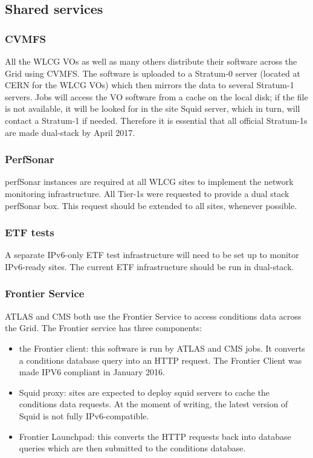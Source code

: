 \documentclass[11pt]{article}
\begin{document}

\subsection{Shared services}
\subsubsection{CVMFS}
All the WLCG VOs as well as many others distribute their software
across the Grid using CVMFS. The software is uploaded to a Stratum-0
server (located at CERN for the WLCG VOs) which then mirrors the data
to several Stratum-1 servers.  Jobs will access the VO software from a
cache on the local disk; if the file is not available, it will be
looked for in the site Squid server, which in turn, will contact a
Stratum-1 if needed.  Therefore it is essential that all official
Stratum-1s \cite{Stratum1} are made dual-stack by April 2017.

\subsubsection{PerfSonar}
perfSonar instances are required at all WLCG sites to implement the
network monitoring infrastructure. All Tier-1s were requested to
provide a dual stack perfSonar box. This request should be extended
to all sites, whenever possible.

\subsubsection{ETF tests}
A separate IPv6-only ETF test infrastructure will need to be set up to
monitor IPv6-ready sites. The current ETF infrastructure should be run
in dual-stack.

\subsubsection{Frontier Service}
ATLAS and CMS both use the Frontier Service\cite{Frontier} to access
conditions data across the Grid. The Frontier service has three
components:
\begin{itemize}
\item the Frontier client: this software is run by ATLAS and CMS
  jobs. It converts a conditions database query into an HTTP request.
  The Frontier Client was made IPV6 compliant in January 2016.
\item Squid proxy: sites are expected to deploy squid servers to cache
  the conditions data requests. At the moment of writing, the latest
  version of Squid is not fully IPv6-compatible.
\item Frontier Launchpad: this converts the HTTP requests back into
  database queries which are then submitted to the conditions
  database.
\end{itemize}
\end{document}
